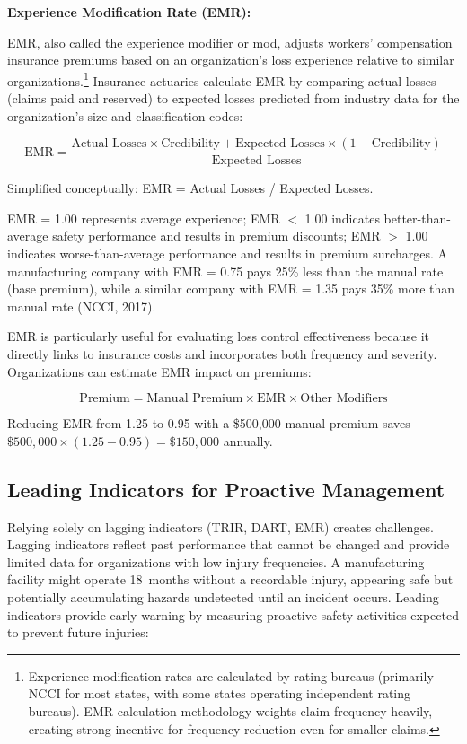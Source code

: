 \documentclass[11pt,openany]{book}
\begin{document}
\textbf{Experience Modification Rate (EMR):}

EMR, also called the experience modifier or mod, adjusts workers' compensation
insurance premiums based on an organization's loss experience relative to
similar organizations.\footnote{Experience modification rates are calculated
by rating bureaus (primarily NCCI for most states, with some states operating
independent rating bureaus). EMR calculation methodology weights claim
frequency heavily, creating strong incentive for frequency reduction even for
smaller claims.} Insurance actuaries calculate EMR by comparing actual losses
(claims paid and reserved) to expected losses predicted from industry data for
the organization's size and classification codes:

\[
\text{EMR} = \frac{\text{Actual Losses} \times \text{Credibility} +
  \text{Expected Losses} \times (1 - \text{Credibility})}
  {\text{Expected Losses}}
\]

Simplified conceptually: EMR = Actual Losses / Expected Losses.

EMR = 1.00 represents average experience; EMR \(<\) 1.00 indicates
better-than-average safety performance and results in premium discounts;
EMR \(>\) 1.00 indicates worse-than-average performance and results in premium
surcharges. A manufacturing company with EMR = 0.75 pays 25\% less than the
manual rate (base premium), while a similar company with EMR = 1.35 pays 35\%
more than manual rate (NCCI, 2017).

EMR is particularly useful for evaluating loss control effectiveness because
it directly links to insurance costs and incorporates both frequency and
severity. Organizations can estimate EMR impact on premiums:

\[
\text{Premium} = \text{Manual Premium} \times \text{EMR} \times
  \text{Other Modifiers}
\]

Reducing EMR from 1.25 to 0.95 with a \$500{,}000 manual premium saves
\(\$500{,}000 \times (1.25 - 0.95) = \$150{,}000\) annually.

\subsection{Leading Indicators for Proactive Management}

Relying solely on lagging indicators (TRIR, DART, EMR) creates challenges.
Lagging indicators reflect past performance that cannot be changed and provide
limited data for organizations with low injury frequencies. A manufacturing
facility might operate 18~months without a recordable injury, appearing safe
but potentially accumulating hazards undetected until an incident occurs.
Leading indicators provide early warning by measuring proactive safety
activities expected to prevent future injuries:
\end{document}
